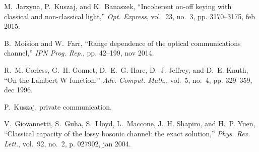 \documentclass[conference]{IEEEtran}
\begin{document}
\begin{thebibliography}{9}
M.~Jarzyna, P.~Kuszaj, and K.~Banaszek, ``Incoherent on-off keying with
  classical and non-classical light,'' \emph{Opt. Express}, vol.~23, no.~3, pp.
  3170--3175, feb 2015.

B.~Moision and W.~Farr, ``Range dependence of the optical communications
  channel,'' \emph{IPN Prog. Rep.}, pp. 42--199, nov 2014.

R.~M. Corless, G.~H. Gonnet, D.~E.~G. Hare, D.~J. Jeffrey, and D.~E. Knuth,
  ``On the Lambert W function,'' \emph{Adv. Comput. Math.}, vol.~5, no.~4, pp.
  329--359, dec 1996.

P.~Kuszaj, private communication.

V.~Giovannetti, S.~Guha, S.~Lloyd, L.~Maccone, J.~H. Shapiro, and H.~P. Yuen,
  ``Classical capacity of the lossy bosonic channel: the exact solution,''
  \emph{Phys. Rev. Lett.}, vol.~92, no.~2, p. 027902, jan 2004.

\end{thebibliography}
\end{document}
